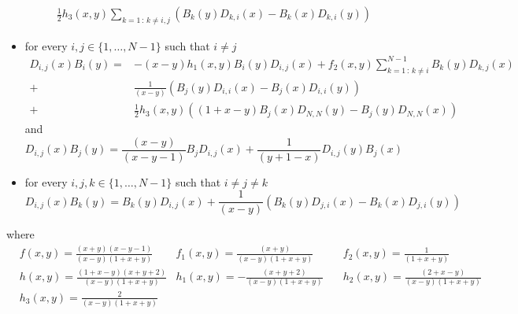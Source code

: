 \documentclass[10pt]{article}
\numberwithin{equation}{section}
\numberwithin{equation}{subsection}
\begin{document}
\begin{itemize}
\begin{equation}
\begin{split}
			\frac{1}{2}h_{3}(x,y)\sum_{k=1\,:\,k\neq i,j}\left(B_{k}(y)D_{k,i}(x)-B_{k}(x)D_{k,i}(y)\right)
		\end{split}
	\end{equation}
\item for every $i,j\in \{1,\ldots,N-1\}$ such that $i\neq j$
\begin{equation}\label{EX4}
	\begin{split}
		D_{i,j}(x)B_{i}(y)=&-(x-y)h_{1}(x,y)B_{i}(y)D_{i,j}(x)+f_{2}(x,y)\sum_{k=1\,:\,k\neq i}^{N-1}B_{k}(y)D_{k,j}(x)\\+&\frac{1}{(x-y)}\left(B_{j}(y)D_{i,i}(x)-B_{j}(x)D_{i,i}(y)\right)\\+&\frac{1}{2}h_{3}(x,y)\left((1+x-y)B_{j}(x)D_{N,N}(y)-B_{j}(y)D_{N,N}(x)\right)
	\end{split}
\end{equation}
and
\begin{equation}\label{EX5}
	D_{i,j}(x)B_{j}(y)=\frac{(x-y)}{(x-y-1)}B_{j}D_{i,j}(x)+\frac{1}{(y+1-x)}D_{i,j}(y)B_{j}(x)
\end{equation}
\item  for every $i,j,k\in \{1,\ldots,N-1\}$ such that $i\neq j\neq k$
\begin{equation}\label{EX6}
	D_{i,j}(x)B_{k}(y)=B_{k}(y)D_{i,j}(x)+\frac{1}{(x-y)}\left(B_{k}(y)D_{j,i}(x)-B_{k}(x)D_{j,i}(y)\right)
\end{equation}
\end{itemize}
where
\begin{align}
	&f(x,y)=\frac{(x+y)(x-y-1)}{(x-y)(1+x+y)}&f_{1}(x,y)=\frac{(x+y)}{(x-y)(1+x+y)}\quad&f_{2}(x,y)=\frac{1}{(1+x+y)}\nonumber\\&h(x,y)=\frac{(1+x-y)(x+y+2)}{(x-y)(1+x+y)}
	&h_{1}(x,y)=-\frac{(x+y+2)}{(x-y)(1+x+y)}\quad&h_{2}(x,y)=\frac{(2+x-y)}{(x-y)(1+x+y)}\nonumber
	\\&h_{3}(x,y)=\frac{2}{(x-y)(1+x+y)}
\end{align}
\end{document}
